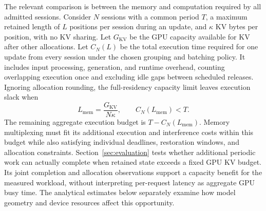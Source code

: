 The relevant comparison is between the memory and computation required by all admitted sessions.
Consider $N$ sessions with a common period $T$, a maximum retained length of $L$ positions per session during an update, and $\kappa$ KV bytes per position, with no KV sharing.
Let $G_{\mathrm{KV}}$ be the GPU capacity available for KV after other allocations.
Let $C_N(L)$ be the total execution time required for one update from every session under the chosen grouping and batching policy.
It includes input processing, generation, and runtime overhead, counting overlapping execution once and excluding idle gaps between scheduled releases.
Ignoring allocation rounding, the full-residency capacity limit leaves execution slack when
\begin{equation}
  L_{\mathrm{mem}}=\frac{G_{\mathrm{KV}}}{N\kappa},
  \qquad C_N(L_{\mathrm{mem}})<T.
  \label{eq:memory-before-compute}
\end{equation}
The remaining aggregate execution budget is $T-C_N(L_{\mathrm{mem}})$.
Memory multiplexing must fit its additional execution and interference costs within this budget while also satisfying individual deadlines, restoration windows, and allocation constraints.
Section~\ref{sec:evaluation} tests whether additional periodic work can actually complete when retained state exceeds a fixed GPU KV budget.
Its joint completion and allocation observations support a capacity benefit for the measured workload, without interpreting per-request latency as aggregate GPU busy time.
The analytical estimates below separately examine how model geometry and device resources affect this opportunity.

